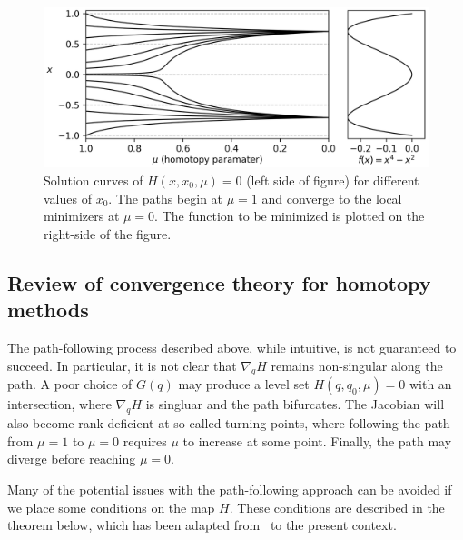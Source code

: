 \begin{figure}[t]
  \centering
  \includegraphics[width=\textwidth]{./figs/chap2/paths.png}
  \caption{Solution curves of $H(x,x_0,\mu) = 0$ (left side of figure) for
    different values of $x_0$.  The paths begin at $\mu=1$ and converge to the
    local minimizers at $\mu=0$.  The function to be minimized is plotted on the
    right-side of the figure.\label{fig:zc}}
\end{figure}

\subsection{Review of convergence theory for homotopy methods}

The path-following process described above, while intuitive, is not guaranteed
to succeed.  In particular, it is not clear that $\nabla_q H$ remains
non-singular along the path.  A poor choice of $G(q)$ may produce a level set
$H(q,q_0,\mu) = 0$ with an intersection, where $\nabla_q H$ is singluar and the path
bifurcates.  The Jacobian will also become rank deficient at so-called turning
points, where following the path from $\mu=1$ to $\mu=0$ requires $\mu$ to
increase at some point.  Finally, the path may diverge before reaching
$\mu=0$.

Many of the potential issues with the path-following approach can be avoided if
we place some conditions on the map $H$.  These conditions are described in the
theorem below, which has been adapted from~\cite{watson_2002} to the present
context.

